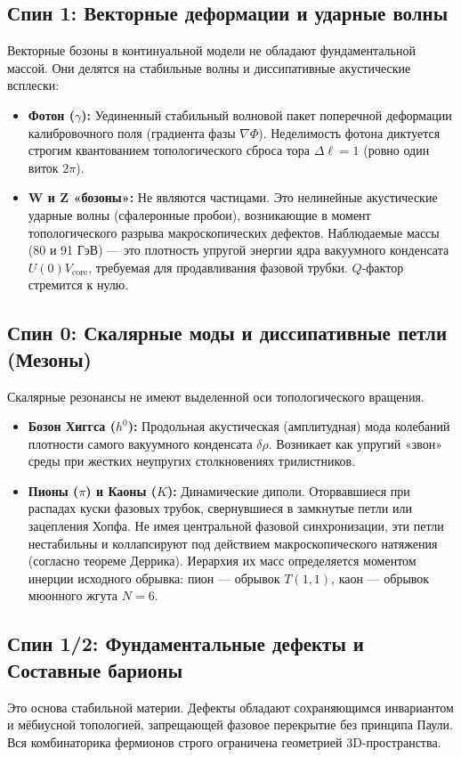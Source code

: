 \documentclass[11pt,a4paper]{article}
\begin{document}
\subsection{Спин 1: Векторные деформации и ударные волны}
Векторные бозоны в континуальной модели не обладают фундаментальной массой. Они делятся на стабильные волны и диссипативные акустические всплески:
\begin{itemize}
    \item \textbf{Фотон ($\gamma$):} Уединенный стабильный волновой пакет поперечной деформации калибровочного поля (градиента фазы $\nabla \Phi$). Неделимость фотона диктуется строгим квантованием топологического сброса тора $\Delta \ell = 1$ (ровно один виток $2\pi$).
    \item \textbf{W и Z «бозоны»:} Не являются частицами. Это нелинейные акустические ударные волны (сфалеронные пробои), возникающие в момент топологического разрыва макроскопических дефектов. Наблюдаемые массы (80 и 91 ГэВ) — это плотность упругой энергии ядра вакуумного конденсата $U(0)V_{\text{core}}$, требуемая для продавливания фазовой трубки. $Q$-фактор стремится к нулю.
\end{itemize}

\subsection{Спин 0: Скалярные моды и диссипативные петли (Мезоны)}
Скалярные резонансы не имеют выделенной оси топологического вращения.
\begin{itemize}
    \item \textbf{Бозон Хиггса ($h^0$):} Продольная акустическая (амплитудная) мода колебаний плотности самого вакуумного конденсата $\delta \rho$. Возникает как упругий «звон» среды при жестких неупругих столкновениях трилистников. 
    \item \textbf{Пионы ($\pi$) и Каоны ($K$):} Динамические диполи. Оторвавшиеся при распадах куски фазовых трубок, свернувшиеся в замкнутые петли или зацепления Хопфа. Не имея центральной фазовой синхронизации, эти петли нестабильны и коллапсируют под действием макроскопического натяжения (согласно теореме Деррика). Иерархия их масс определяется моментом инерции исходного обрывка: пион — обрывок $T(1,1)$, каон — обрывок мюонного жгута $N=6$.
\end{itemize}

\subsection{Спин 1/2: Фундаментальные дефекты и Составные барионы}
Это основа стабильной материи. Дефекты обладают сохраняющимся инвариантом и мёбиусной топологией, запрещающей фазовое перекрытие без принципа Паули. Вся комбинаторика фермионов строго ограничена геометрией 3D-пространства.
\end{document}
